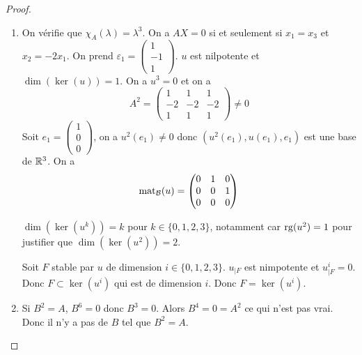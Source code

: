 \documentclass[12pt]{article}
\begin{document}
\begin{proof}
	\phantom{}
	\begin{enumerate}
		\item On vérifie que $\chi_{A}(\lambda)=\lambda^{3}$. On a $AX=0$ si et seulement si $x_{1}=x_{3}$ et $x_{2}=-2x_{1}$. On prend $\varepsilon_{1}=\begin{pmatrix}
			1\\-1\\1
		\end{pmatrix}$. $u$ est nilpotente et $\dim(\ker(u))=1$. On a $u^{3}=0$ et on a
		\begin{equation}
			A^{2}=\begin{pmatrix}
				1&1&1\\
				-2&-2&-2\\
				1&1&1
			\end{pmatrix}\neq0
		\end{equation}
		Soit $e_{1}=\begin{pmatrix}
			1\\0\\0
		\end{pmatrix}$, on a $u^{2}(e_{1})\neq0$ donc $(u^{2}(e_{1}),u(e_{1}),e_{1})$ est une base de $\mathbb{R}^{3}$. On a
		\begin{equation}
			\operatorname{mat}_{\mathcal{B}}(u)=\begin{pmatrix}
				0&1&0\\
				0&0&1\\
				0&0&0
			\end{pmatrix}
		\end{equation}
		
		$\dim(\ker(u^{k}))=k$ pour $k\in\lbrace0,1,2,3\rbrace$, notamment car $\operatorname{rg}(u^{2})=1$ pour justifier que $\dim(\ker(u^{2}))=2$.

		Soit $F$ stable par $u$ de dimension $i\in\lbrace0,1,2,3\rbrace$. $u_{\mid F}$ est nimpotente et $u_{\mid F}^{i}=0$. Donc $F\subset\ker(u^{i})$ qui est de dimension $i$. Donc $F=\ker(u^{i})$.

		\item Si $B^{2}=A$, $B^{6}=0$ donc $B^{3}=0$. Alors $B^{4}=0=A^{2}$ ce qui n'est pas vrai. Donc il n'y a pas de $B$ tel que $B^{2}=A$.
	\end{enumerate}
\end{proof}
\end{document}
